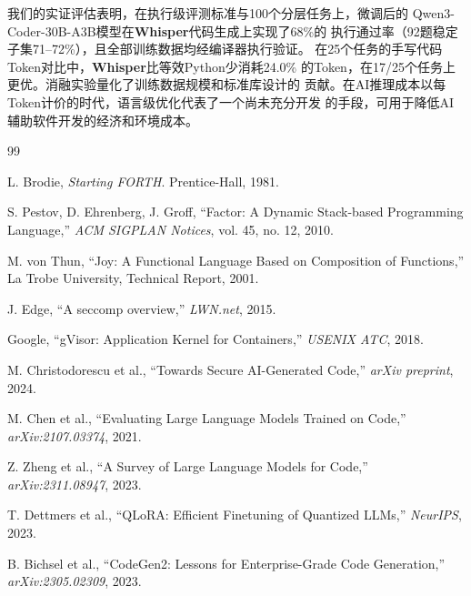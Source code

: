 \documentclass[11pt,a4paper]{ctexart}
\begin{document}
我们的实证评估表明，在执行级评测标准与100个分层任务上，微调后的
Qwen3-Coder-30B-A3B模型在\textbf{Whisper}代码生成上实现了68\%的
执行通过率（92题稳定子集71--72\%），且全部训练数据均经编译器执行验证。
在25个任务的手写代码Token对比中，\textbf{Whisper}比等效Python少消耗24.0\%
的Token，在17/25个任务上更优。消融实验量化了训练数据规模和标准库设计的
贡献。在AI推理成本以每Token计价的时代，语言级优化代表了一个尚未充分开发
的手段，可用于降低AI辅助软件开发的经济和环境成本。


\begin{thebibliography}{99}

L. Brodie, \textit{Starting FORTH}. Prentice-Hall, 1981.

S. Pestov, D. Ehrenberg, J. Groff, ``Factor: A Dynamic Stack-based
Programming Language,'' \textit{ACM SIGPLAN Notices}, vol. 45, no. 12, 2010.

M. von Thun, ``Joy: A Functional Language Based on Composition of Functions,''
La Trobe University, Technical Report, 2001.

J. Edge, ``A seccomp overview,'' \textit{LWN.net}, 2015.

Google, ``gVisor: Application Kernel for Containers,''
\textit{USENIX ATC}, 2018.

M. Christodorescu et al., ``Towards Secure AI-Generated Code,'' \textit{arXiv
  preprint}, 2024.

M. Chen et al., ``Evaluating Large Language Models Trained on Code,''
\textit{arXiv:2107.03374}, 2021.

Z. Zheng et al., ``A Survey of Large Language Models for Code,''
\textit{arXiv:2311.08947}, 2023.

T. Dettmers et al., ``QLoRA: Efficient Finetuning of Quantized LLMs,''
\textit{NeurIPS}, 2023.

B. Bichsel et al., ``CodeGen2: Lessons for Enterprise-Grade Code Generation,''
\textit{arXiv:2305.02309}, 2023.

\end{thebibliography}
\end{document}
